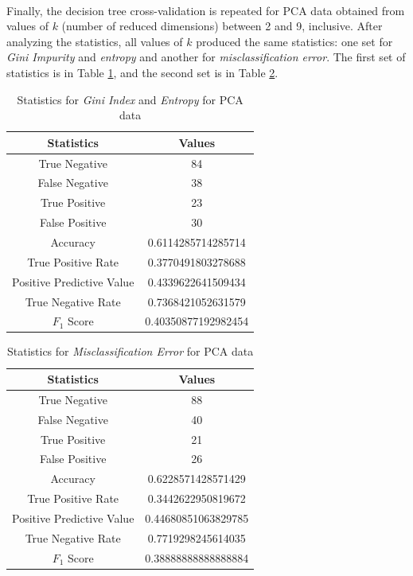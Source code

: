 \documentclass[12pt]{article}
\begin{document}
    \paragraph{}
    Finally, the decision tree cross-validation is repeated for PCA data obtained from values of $k$ (number of reduced dimensions) between 2 and 9, inclusive. After analyzing the statistics, all values of $k$ produced the same statistics: one set for \textit{Gini Impurity} and \textit{entropy} and another for \textit{misclassification error}. The first set of statistics is in Table \ref{gestats}, and the second set is in Table \ref{mestats}.
    \begin{table}[H]
    	\centering
    	\begin{tabular}{|c | c|}
    		\hline
    		Statistics & Values\\ \hline
    		True Negative & 84 \\
    		False Negative & 38 \\
    		True Positive & 23 \\
    		False Positive & 30 \\
    		Accuracy & 0.6114285714285714 \\
    		True Positive Rate & 0.3770491803278688 \\
    		Positive Predictive Value & 0.4339622641509434 \\
    		True Negative Rate & 0.7368421052631579 \\
    		$F_1$ Score & 0.40350877192982454 \\ \hline
    	\end{tabular}
    	\caption{Statistics for \textit{Gini  Index} and \textit{Entropy} for PCA data}\label{gestats}
    \end{table}
    \begin{table}[H]
    	\centering
    	\begin{tabular}{|c | c|}
    		\hline
    		Statistics & Values\\ \hline
    		True Negative & 88 \\
    		False Negative & 40 \\
    		True Positive & 21 \\
    		False Positive & 26 \\
    		Accuracy & 0.6228571428571429 \\
    		True Positive Rate & 0.3442622950819672 \\
    		Positive Predictive Value & 0.44680851063829785 \\
    		True Negative Rate & 0.7719298245614035 \\
    		$F_1$ Score & 0.38888888888888884 \\ \hline
    	\end{tabular}
    	\caption{Statistics for \textit{Misclassification Error} for PCA data}\label{mestats}
    \end{table}
\end{document}

